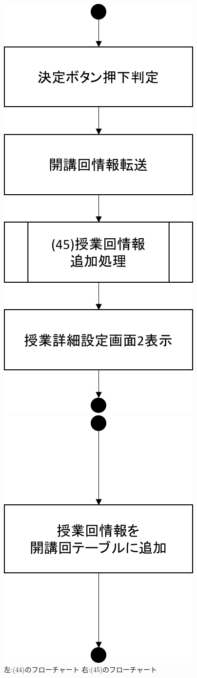 \begin{figure}[htbp]
 \begin{minipage}{0.5\hsize}
  \begin{center}
   \includegraphics[width=0.5\linewidth,clip]{./img/flow/44.png}
  \end{center}
 \end{minipage}
 \begin{minipage}{0.5\hsize}
  \begin{center}
   \includegraphics[width=0.5\linewidth,clip]{./img/flow/45.png}
  \end{center}
 \end{minipage}
 \caption{左:(44)のフローチャート 右:(45)のフローチャート}\label{fig:44to45}
\end{figure}


